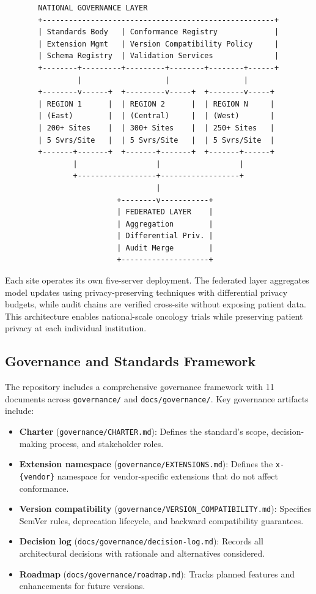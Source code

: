 \begin{figure}[H]
\begin{verbatim}
  NATIONAL GOVERNANCE LAYER
  +-----------------------------------------------------+
  | Standards Body   | Conformance Registry             |
  | Extension Mgmt   | Version Compatibility Policy     |
  | Schema Registry  | Validation Services              |
  +--------+---------+---------+--------+--------+------+
           |                   |                 |
  +--------v------+  +---------v-----+  +--------v-----+
  | REGION 1      |  | REGION 2      |  | REGION N     |
  | (East)        |  | (Central)     |  | (West)       |
  | 200+ Sites    |  | 300+ Sites    |  | 250+ Sites   |
  | 5 Svrs/Site   |  | 5 Svrs/Site   |  | 5 Svrs/Site  |
  +-------+-------+  +-------+-------+  +-------+------+
          |                  |                  |
          +------------------+------------------+
                             |
                    +--------v-----------+
                    | FEDERATED LAYER    |
                    | Aggregation        |
                    | Differential Priv. |
                    | Audit Merge        |
                    +--------------------+
\end{verbatim}
\end{figure}

Each site operates its own five-server deployment. The federated layer aggregates model updates using privacy-preserving techniques with differential privacy budgets, while audit chains are verified cross-site without exposing patient data. This architecture enables national-scale oncology trials while preserving patient privacy at each individual institution.

\subsection{Governance and Standards Framework}

The repository includes a comprehensive governance framework with 11 documents across \texttt{governance/} and \texttt{docs/governance/}. Key governance artifacts include:

\begin{itemize}[leftmargin=*]
\item \textbf{Charter} (\texttt{governance/CHARTER.md}): Defines the standard's scope, decision-making process, and stakeholder roles.
\item \textbf{Extension namespace} (\texttt{governance/EXTENSIONS.md}): Defines the \texttt{x-\{vendor\}} namespace for vendor-specific extensions that do not affect conformance.
\item \textbf{Version compatibility} (\texttt{governance/VERSION\_COMPATIBILITY.md}): Specifies SemVer rules, deprecation lifecycle, and backward compatibility guarantees.
\item \textbf{Decision log} (\texttt{docs/governance/decision-log.md}): Records all architectural decisions with rationale and alternatives considered.
\item \textbf{Roadmap} (\texttt{docs/governance/roadmap.md}): Tracks planned features and enhancements for future versions.
\end{itemize}

